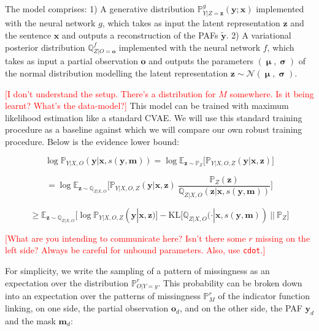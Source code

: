 \documentclass[a4paper,12pt,twoside,openright]{article}
\newcommand{\crit}[1]{\textcolor{red}{#1}}
\begin{document}
The model comprises: 1) A generative distribution $\mathbb{P}^g_{Y | Z = \mathbf{z}} (\mathbf{y} ; \mathbf{x})$ implemented with the neural network $g$, which takes as input the latent representation $\mathbf{z}$ and the sentence $\mathbf{x}$ and outputs a reconstruction of the PAFs $\tilde{\mathbf{y}}$. 2) A variational posterior distribution $\mathbb{Q}^{f}_{Z | O = \mathbf{o}}$ implemented with the neural network $f$, which takes as input a partial observation $\mathbf{o}$ and outputs the parameters $(\boldsymbol{\upmu}, \boldsymbol{\upsigma})$ of the normal distribution modelling the latent representation $\mathbf{z} \sim \mathcal{N} (\boldsymbol{\upmu}, \boldsymbol{\upsigma})$.

\crit{[I don't understand the setup. There's a distribution for $M$ somewhere. Is it being learnt? What's the data-model?]} This model can be trained with maximum likelihood estimation like a standard CVAE. We will use this standard training procedure as a baseline against which we will compare our own robust training procedure. Below is the evidence lower bound:

\[
    \log \mathbb{P}_{Y | X, O} (\mathbf{y} | \mathbf{x}, s(\mathbf{y}, \mathbf{m})) = \log \mathbb{E}_{\mathbf{z} \sim \mathbb{P}_Z} \bigl[ \mathbb{P}_{Y | X, O, Z} (\mathbf{y} | \mathbf{x}, \mathbf{z}) \bigr]
\]

\[
    = \log \mathbb{E}_{\mathbf{z} \sim \mathbb{Q}_{Z | X, O}} \Biggl[ \mathbb{P}_{Y | X, O, Z} (\mathbf{y} | \mathbf{x}, \mathbf{z}) ~ \frac{\mathbb{P}_{Z} (\mathbf{z})}{\mathbb{Q}_{Z | X, O} (\mathbf{z} | \mathbf{x}, s(\mathbf{y}, \mathbf{m}))} \Biggr]
\]

\[
    \geq \mathbb{E}_{\mathbf{z} \sim \mathbb{Q}_{Z | X, O}} \bigl[ \log \mathbb{P}_{Y | X, O, Z} (\mathbf{y} | \mathbf{x}, \mathbf{z}) \bigr] - \mathrm{KL} \bigl[ \mathbb{Q}_{Z | X, O} (\cdot | \mathbf{x}, s(\mathbf{y}, \mathbf{m})) ~||~ \mathbb{P}_{Z} \bigr]
\]

\crit{[What are you intending to communicate here? Isn't there some $r$ missing on the left side? Always be careful for unbound parameters. Also, use \texttt{cdot}.]}

For simplicity, we write the sampling of a pattern of missingness as an expectation over the distribution $\mathbb{P}^r_{O | Y=y}$. This probability can be broken down into an expectation over the patterns of missingness $\mathbb{P}^r_M$ of the indicator function linking, on one side, the partial observation $\mathbf{o}_d$, and on the other side, the PAF $\mathbf{y}_d$ and the mask $\mathbf{m}_d$:
\end{document}
